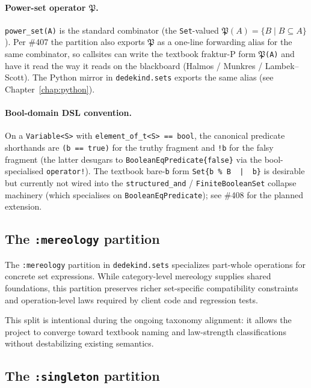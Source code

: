 \documentclass[11pt, a4paper]{report}
\begin{document}
\paragraph{Power-set operator $\mathfrak{P}$.} \texttt{power\_set(A)} is the standard combinator (the \texttt{Set}-valued $\mathfrak{P}(A) = \{B \mid B \subseteq A\}$). Per \#407 the partition also exports \texttt{$\mathfrak{P}$} as a one-line forwarding alias for the same combinator, so callsites can write the textbook fraktur-P form \texttt{$\mathfrak{P}$(A)} and have it read the way it reads on the blackboard (Halmos / Munkres / Lambek--Scott). The Python mirror in \texttt{dedekind.sets} exports the same alias (see Chapter~\ref{chap:python}).

\paragraph{Bool-domain DSL convention.} On a \texttt{Variable<S>} with \texttt{element\_of\_t<S> == bool}, the canonical predicate shorthands are \texttt{(b == true)} for the truthy fragment and \texttt{!b} for the falsy fragment (the latter desugars to \texttt{BooleanEqPredicate\{false\}} via the bool-specialised \texttt{operator!}). The textbook bare-\texttt{b} form \texttt{Set\{b \% B \,|\, b\}} is desirable but currently not wired into the \texttt{structured\_and} / \texttt{FiniteBooleanSet} collapse machinery (which specialises on \texttt{BooleanEqPredicate}); see \#408 for the planned extension.

\subsection{The \texttt{:mereology} partition}

The \texttt{:mereology} partition in \texttt{dedekind.sets} specializes part-whole operations for concrete set expressions. While category-level mereology supplies shared foundations, this partition preserves richer set-specific compatibility constraints and operation-level laws required by client code and regression tests.

This split is intentional during the ongoing taxonomy alignment: it allows the project to converge toward textbook naming and law-strength classifications without destabilizing existing semantics.

\subsection{The \texttt{:singleton} partition}
\end{document}
